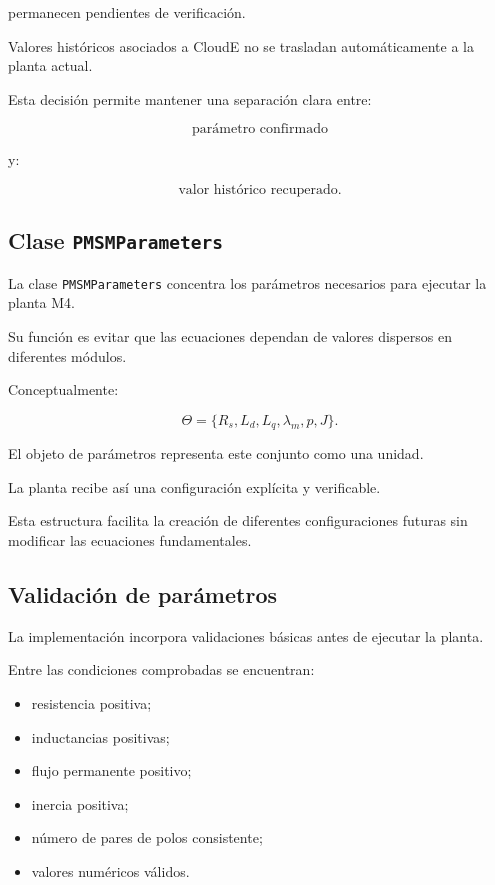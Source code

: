permanecen pendientes de verificación.

Valores históricos asociados a CloudE no se trasladan automáticamente a la planta actual.

Esta decisión permite mantener una separación clara entre:

\begin{equation}
\text{parámetro confirmado}
\end{equation}

y:

\begin{equation}
\text{valor histórico recuperado}.
\end{equation}

\subsection{Clase \texttt{PMSMParameters}}

La clase \texttt{PMSMParameters} concentra los parámetros necesarios para ejecutar la planta M4.

Su función es evitar que las ecuaciones dependan de valores dispersos en diferentes módulos.

Conceptualmente:

\begin{equation}
\Theta=
\{
R_s,
L_d,
L_q,
\lambda_m,
p,
J
\}.
\end{equation}

El objeto de parámetros representa este conjunto como una unidad.

La planta recibe así una configuración explícita y verificable.

Esta estructura facilita la creación de diferentes configuraciones futuras sin modificar las ecuaciones fundamentales.

\subsection{Validación de parámetros}

La implementación incorpora validaciones básicas antes de ejecutar la planta.

Entre las condiciones comprobadas se encuentran:

\begin{itemize}
    \item resistencia positiva;
    \item inductancias positivas;
    \item flujo permanente positivo;
    \item inercia positiva;
    \item número de pares de polos consistente;
    \item valores numéricos válidos.
\end{itemize}

